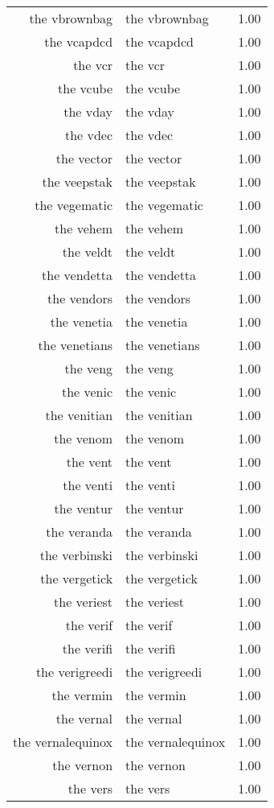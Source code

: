 \begin{table}[ht]
\begin{tabular}{rlr}
  the vbrownbag & the vbrownbag & 1.00 \\ 
  the vcapdcd & the vcapdcd & 1.00 \\ 
  the vcr & the vcr & 1.00 \\ 
  the vcube & the vcube & 1.00 \\ 
  the vday & the vday & 1.00 \\ 
  the vdec & the vdec & 1.00 \\ 
  the vector & the vector & 1.00 \\ 
  the veepstak & the veepstak & 1.00 \\ 
  the vegematic & the vegematic & 1.00 \\ 
  the vehem & the vehem & 1.00 \\ 
  the veldt & the veldt & 1.00 \\ 
  the vendetta & the vendetta & 1.00 \\ 
  the vendors & the vendors & 1.00 \\ 
  the venetia & the venetia & 1.00 \\ 
  the venetians & the venetians & 1.00 \\ 
  the veng & the veng & 1.00 \\ 
  the venic & the venic & 1.00 \\ 
  the venitian & the venitian & 1.00 \\ 
  the venom & the venom & 1.00 \\ 
  the vent & the vent & 1.00 \\ 
  the venti & the venti & 1.00 \\ 
  the ventur & the ventur & 1.00 \\ 
  the veranda & the veranda & 1.00 \\ 
  the verbinski & the verbinski & 1.00 \\ 
  the vergetick & the vergetick & 1.00 \\ 
  the veriest & the veriest & 1.00 \\ 
  the verif & the verif & 1.00 \\ 
  the verifi & the verifi & 1.00 \\ 
  the verigreedi & the verigreedi & 1.00 \\ 
  the vermin & the vermin & 1.00 \\ 
  the vernal & the vernal & 1.00 \\ 
  the vernalequinox & the vernalequinox & 1.00 \\ 
  the vernon & the vernon & 1.00 \\ 
  the vers & the vers & 1.00 \\ 

\end{tabular}
\end{table}
